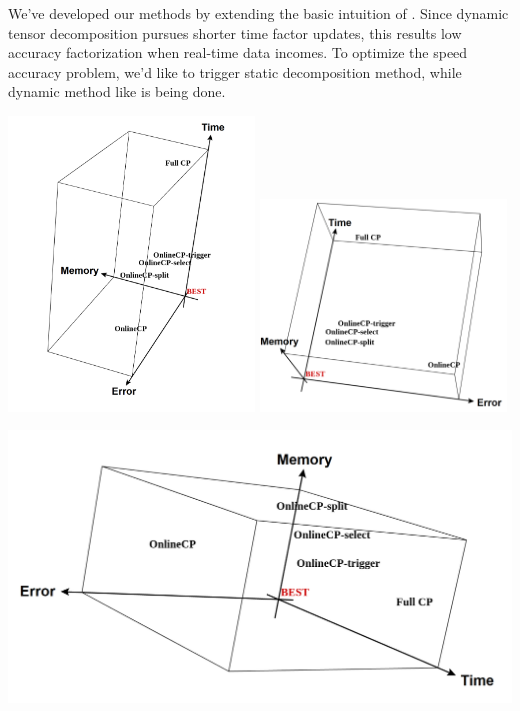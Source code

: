 
We've developed our methods by extending the basic intuition of \ocp. Since dynamic tensor decomposition pursues shorter time factor updates, this results low accuracy factorization when real-time data incomes. To optimize the speed accuracy problem, we'd like to trigger static decomposition method, \cpals while dynamic method like \ocp is being done.

\begin{center}
	\includegraphics[width=0.49\textwidth]{FIG/method-comparison1.png}
	\includegraphics[width=0.49\textwidth]{FIG/method-comparison3.png}
\end{center}
\begin{center}
	\includegraphics[width=1\textwidth]{FIG/method-comparison2.png}
\end{center}


